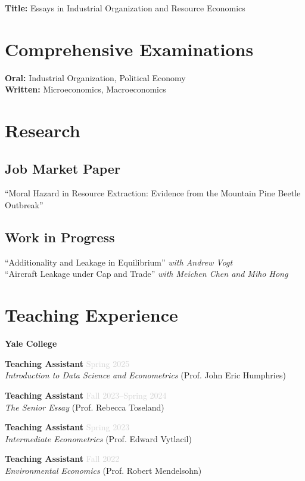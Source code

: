 \documentclass[11pt,letterpaper]{article}
\newcommand{\jobtitle}[1]{\textbf{\color{mediumgray}#1}}
\newcommand{\institution}[1]{\textit{#1}}
\newcommand{\daterange}[1]{\textcolor{lightgray}{#1}}
\begin{document}
\textbf{Title:} Essays in Industrial Organization and Resource Economics

\section*{Comprehensive Examinations}
\textbf{Oral:} Industrial Organization, Political Economy \\
\textbf{Written:} Microeconomics, Macroeconomics  

\section*{Research}

\subsection*{Job Market Paper}
``Moral Hazard in Resource Extraction: Evidence from the Mountain Pine Beetle Outbreak''

\subsection*{Work in Progress}
``Additionality and Leakage in Equilibrium'' \textit{with Andrew Vogt} \\
``Aircraft Leakage under Cap and Trade'' \textit{with Meichen Chen and Miho Hong}

\newpage

\section*{Teaching Experience}

\textbf{Yale College}

\jobtitle{Teaching Assistant} \hfill \daterange{Spring 2025} \\
\institution{Introduction to Data Science and Econometrics} (Prof. John Eric Humphries)

\jobtitle{Teaching Assistant} \hfill \daterange{Fall 2023--Spring 2024} \\
\institution{The Senior Essay} (Prof. Rebecca Toseland)

\jobtitle{Teaching Assistant} \hfill \daterange{Spring 2023} \\
\institution{Intermediate Econometrics} (Prof. Edward Vytlacil)

\jobtitle{Teaching Assistant} \hfill \daterange{Fall 2022} \\
\institution{Environmental Economics} (Prof. Robert Mendelsohn)
\end{document}
